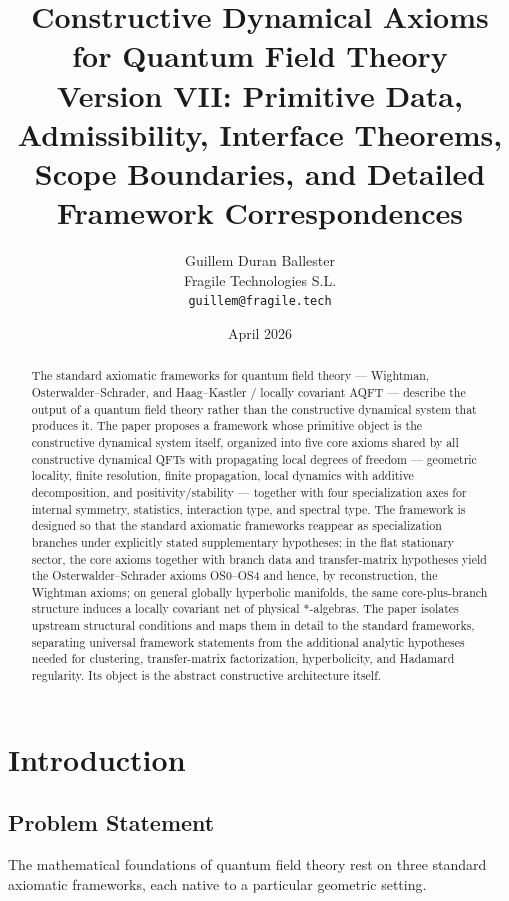 \documentclass[12pt,a4paper]{article}
\title{Constructive Dynamical Axioms for Quantum Field Theory\\[6pt]
\large Version VII: Primitive Data, Admissibility, Interface Theorems,\\
Scope Boundaries, and Detailed Framework Correspondences}
\author{Guillem Duran Ballester\\
Fragile Technologies S.L.\\
\texttt{guillem@fragile.tech}}
\date{April 2026}
\theoremstyle{plain}
\theoremstyle{definition}
\theoremstyle{remark}
\begin{document}
\maketitle

\begin{abstract}
The standard axiomatic frameworks for quantum field theory ---
Wightman, Osterwalder--Schrader, and Haag--Kastler / locally covariant AQFT ---
describe the output of a quantum field theory rather than the
constructive dynamical system that produces it.
The paper proposes a framework whose primitive object is the
constructive dynamical system itself, organized into five core axioms
shared by all constructive dynamical QFTs with propagating local
degrees of freedom --- geometric locality, finite resolution, finite
propagation, local dynamics with additive decomposition, and
positivity/stability --- together with four specialization axes for
internal symmetry, statistics, interaction type, and spectral type.
The framework is designed so that the standard axiomatic frameworks
reappear as specialization branches under explicitly stated
supplementary hypotheses: in the flat stationary sector, the core
axioms together with branch data and transfer-matrix hypotheses yield
the Osterwalder--Schrader axioms OS0--OS4 and hence, by
reconstruction, the Wightman axioms; on general globally hyperbolic
manifolds, the same core-plus-branch structure induces a locally
covariant net of physical $*$-algebras. The paper isolates upstream
structural conditions and maps them in detail to the standard
frameworks, separating universal framework statements from the
additional analytic hypotheses needed for clustering,
transfer-matrix factorization, hyperbolicity, and Hadamard
regularity. Its object is the abstract constructive architecture
itself.
\end{abstract}

\tableofcontents
\newpage

\section{Introduction}

\subsection{Problem Statement}

The mathematical foundations of quantum field theory rest on three
standard axiomatic frameworks, each native to a particular geometric
setting.
\end{document}
